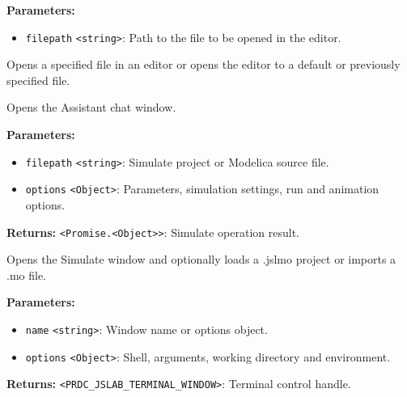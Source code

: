 \documentclass[12pt,a4paper]{article}
\begin{document}
\noindent \textbf{Parameters:}
\begin{itemize}
  \item \texttt{filepath} \texttt{<string>}: Path to the file to be opened in the editor.
\end{itemize}

\noindent Opens a specified file in an editor or opens the editor to a default or previously specified file.

\vspace{5mm}
\noindent {}


\noindent Opens the Assistant chat window.

\vspace{5mm}
\noindent {}


\noindent \textbf{Parameters:}
\begin{itemize}
  \item \texttt{filepath} \texttt{<string>}: Simulate project or Modelica source file.
  \item \texttt{options} \texttt{<Object>}: Parameters, simulation settings, run and animation options.
\end{itemize}

\noindent \textbf{Returns:} \texttt{<Promise.<Object>>}: Simulate operation result.

\noindent Opens the Simulate window and optionally loads a .jslmo project or imports a .mo file.

\vspace{5mm}
\noindent {}


\noindent \textbf{Parameters:}
\begin{itemize}
  \item \texttt{name} \texttt{<string>}: Window name or options object.
  \item \texttt{options} \texttt{<Object>}: Shell, arguments, working directory and environment.
\end{itemize}

\noindent \textbf{Returns:} \texttt{<PRDC\_JSLAB\_TERMINAL\_WINDOW>}: Terminal control handle.
\end{document}
